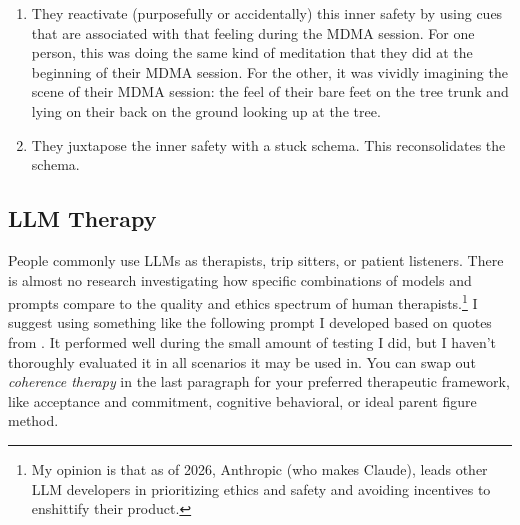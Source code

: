 \documentclass[11pt,oneside]{book}
\begin{document}
\begin{itemize}
\begin{enumerate}
        \item They reactivate (purposefully or accidentally) this inner safety by using cues that are associated with that feeling during the MDMA session. For one person, this was doing the same kind of meditation that they did at the beginning of their MDMA session. For the other, it was vividly imagining the scene of their MDMA session: the feel of their bare feet on the tree trunk and lying on their back on the ground looking up at the tree.
        \item They juxtapose the inner safety with a stuck schema. This reconsolidates the schema.
    \end{enumerate}
\end{itemize}

\subsection*{LLM Therapy}
People commonly use LLMs as therapists, trip sitters, or patient listeners. There is almost no research investigating how specific combinations of models and prompts compare to the quality and ethics spectrum of human therapists.\footnote{My opinion is that as of 2026, Anthropic (who makes Claude), leads other LLM developers in prioritizing ethics and safety and avoiding incentives to enshittify their product.} I suggest using something like the following prompt I developed based on quotes from \textcites{BRWAIdownload}[p. 46]{eckerUnlocking}. It performed well during the small amount of testing I did, but I haven't thoroughly evaluated it in all scenarios it may be used in. You can swap out \textit{coherence therapy} in the last paragraph for your preferred therapeutic framework, like acceptance and commitment, cognitive behavioral, or ideal parent figure method.
\end{document}
